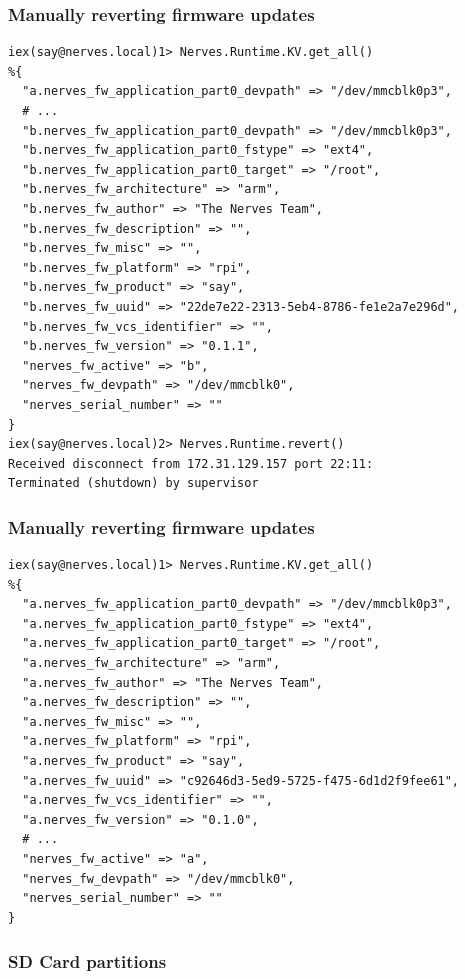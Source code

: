 \documentclass[10pt,xcolor=pdflatex,dvipsnames,table]{beamer}
\begin{document}
\begin{frame}[fragile]
  \frametitle{Manually reverting firmware updates}

  \begin{verbatim}
iex(say@nerves.local)1> Nerves.Runtime.KV.get_all()
%{
  "a.nerves_fw_application_part0_devpath" => "/dev/mmcblk0p3",
  # ...
  "b.nerves_fw_application_part0_devpath" => "/dev/mmcblk0p3",
  "b.nerves_fw_application_part0_fstype" => "ext4",
  "b.nerves_fw_application_part0_target" => "/root",
  "b.nerves_fw_architecture" => "arm",
  "b.nerves_fw_author" => "The Nerves Team",
  "b.nerves_fw_description" => "",
  "b.nerves_fw_misc" => "",
  "b.nerves_fw_platform" => "rpi",
  "b.nerves_fw_product" => "say",
  "b.nerves_fw_uuid" => "22de7e22-2313-5eb4-8786-fe1e2a7e296d",
  "b.nerves_fw_vcs_identifier" => "",
  "b.nerves_fw_version" => "0.1.1",
  "nerves_fw_active" => "b",
  "nerves_fw_devpath" => "/dev/mmcblk0",
  "nerves_serial_number" => ""
}
iex(say@nerves.local)2> Nerves.Runtime.revert()
Received disconnect from 172.31.129.157 port 22:11:
Terminated (shutdown) by supervisor
  \end{verbatim}
\end{frame}

\begin{frame}[fragile]
  \frametitle{Manually reverting firmware updates}

  \begin{verbatim}
iex(say@nerves.local)1> Nerves.Runtime.KV.get_all()
%{
  "a.nerves_fw_application_part0_devpath" => "/dev/mmcblk0p3",
  "a.nerves_fw_application_part0_fstype" => "ext4",
  "a.nerves_fw_application_part0_target" => "/root",
  "a.nerves_fw_architecture" => "arm",
  "a.nerves_fw_author" => "The Nerves Team",
  "a.nerves_fw_description" => "",
  "a.nerves_fw_misc" => "",
  "a.nerves_fw_platform" => "rpi",
  "a.nerves_fw_product" => "say",
  "a.nerves_fw_uuid" => "c92646d3-5ed9-5725-f475-6d1d2f9fee61",
  "a.nerves_fw_vcs_identifier" => "",
  "a.nerves_fw_version" => "0.1.0",
  # ...
  "nerves_fw_active" => "a",
  "nerves_fw_devpath" => "/dev/mmcblk0",
  "nerves_serial_number" => ""
}
  \end{verbatim}
\end{frame}



\begin{frame}
\frametitle{SD Card partitions}
\begin{center}
\end{center}
\end{frame}
\end{document}
